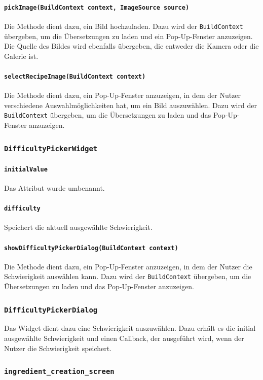 \documentclass{implementierungsheft}
\begin{document}
\paragraph*{\texttt{pickImage(BuildContext context, ImageSource source)}}
Die Methode dient dazu, ein Bild hochzuladen. Dazu wird der \texttt{BuildContext} übergeben, um die Übersetzungen zu laden und ein Pop-Up-Fenster anzuzeigen. Die Quelle des Bildes wird ebenfalls übergeben, die entweder die Kamera oder die Galerie ist.
\paragraph{\texttt{selectRecipeImage(BuildContext context)}}
Die Methode dient dazu, ein Pop-Up-Fenster anzuzeigen, in dem der Nutzer verschiedene Auswahlmöglichkeiten hat, um ein Bild auszuwählen. Dazu wird der \texttt{BuildContext} übergeben, um die Übersetzungen zu laden und das Pop-Up-Fenster anzuzeigen.
\subsubsection*{\texttt{DifficultyPickerWidget}}
\paragraph*{\texttt{initialValue}}
Das Attribut wurde umbenannt.
\paragraph*{\texttt{difficulty}}
Speichert die aktuell ausgewählte Schwierigkeit.
\paragraph*{\texttt{showDifficultyPickerDialog(BuildContext context)}}
Die Methode dient dazu, ein Pop-Up-Fenster anzuzeigen, in dem der Nutzer die Schwierigkeit auswählen kann. Dazu wird der \texttt{BuildContext} übergeben, um die Übersetzungen zu laden und das Pop-Up-Fenster anzuzeigen.
\subsubsection*{\texttt{DifficultyPickerDialog}}
Das Widget dient dazu eine Schwierigkeit auszuwählen. Dazu erhält es die initial ausgewählte Schwierigkeit und einen Callback, der ausgeführt wird, wenn der Nutzer die Schwierigkeit speichert.
\subsubsection{\texttt{ingredient\_creation\_screen}}
\end{document}
